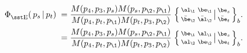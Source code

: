 \begin{equation}\label{FRW}\begin{aligned}
\Phi_{\rm\sst E}^{}(\,p_s\,|\,p_t)\;=\;&
\frac{M(p_4,p_3,p_s)M(p_s,p_\2,p_\1)}{M(p_4,p_t,p_\1)M(p_t,p_3,p_\2)}
\;\Big\{\begin{smallmatrix} \al_\1 & \be_\1 \\[.5ex]
\bar{\be}_\2 & \bar{\al}_\2
\end{smallmatrix}\big|\begin{smallmatrix} \be_s\\[.5ex]
\bar{\be}_t \end{smallmatrix}\Big\}_b^{}.\\
=\;& \frac{M(p_4,p_3,p_s)M(p_s,p_\2,p_\1)}{M(p_4,p_t,p_\1)M(p_t,p_3,p_\2)}
\;\Big\{\begin{smallmatrix} \be_\1 & \al_\1 \\[.5ex]
\al_\2 & \be_\2
\end{smallmatrix}\big|\begin{smallmatrix} \be_s\\[.5ex]
\be_t \end{smallmatrix}\Big\}_b^{}.
\end{aligned}
\end{equation}


